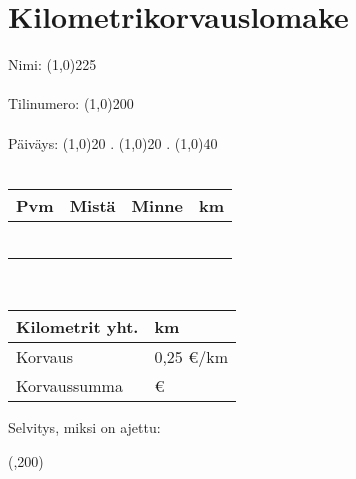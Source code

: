 \documentclass{article}
\begin{document}
\section*{Kilometrikorvauslomake}

Nimi: \line(1,0){225}\\\\
Tilinumero: \line(1,0){200}\\\\
Päiväys: \line(1,0){20} . \line(1,0){20} . \line(1,0){40}\\\\

\begin{tabu} to 0.8\textwidth { | X[c] | X[c] | X[c] | X[c] | }
 \hline
 Pvm & Mistä & Minne & km \\
 \hline
 & & & \\
\hline
 & & & \\
\hline
 & & & \\
\hline
 & & & \\
\hline
 & & & \\
\hline
 & & & \\
\hline
\end{tabu}\\
\begin{flushright}
  \begin{tabu} to 0.4\textwidth {| X[l] | X[r] | }
    \hline
    Kilometrit yht. & km \\
    \hline
    Korvaus & 0,25 €/km \\
    \hline
    Korvaussumma & € \\
  \hline
\end{tabu}
\end{flushright}

\begin{flushleft}
Selvitys, miksi on ajettu:
\end{flushleft}
\centering
\framebox(\textwidth,200)
\end{document}
